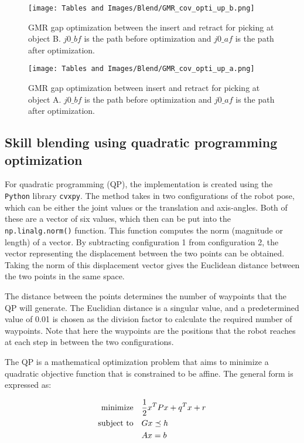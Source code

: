 \documentclass[Setup/main.tex]{subfiles}
\begin{document}
\begin{figure}[H]
    \centering
    \texttt{[image: Tables and Images/Blend/GMR\_cov\_opti\_up\_b.png]}
    \caption{GMR gap optimization between the insert and retract for picking at object B. $j0\_bf$ is the path before optimization and $j0\_af$ is the path after optimization.}
    \label{fig:GMR_cov_opti_up_b}
\end{figure}

\begin{figure}[H]
    \centering
    \texttt{[image: Tables and Images/Blend/GMR\_cov\_opti\_up\_a.png]}
    \caption{GMR gap optimization between insert and retract for picking at object A. $j0\_bf$ is the path before optimization and $j0\_af$ is the path after optimization.}
    \label{fig:GMR_cov_opti_up_a}
\end{figure}

\newpage
\subsection{Skill blending using quadratic programming optimization} \label{sec:blend:qp}
For quadratic programming (QP), the implementation is created using the \texttt{Python} library \texttt{cvxpy}. The method takes in two configurations of the robot pose, which can be either the joint values or the translation and axis-angles. Both of these are a vector of six values, which then can be put into the \texttt{np.linalg.norm()} function. This function computes the norm (magnitude or length) of a vector. By subtracting configuration 1 from configuration 2, the vector representing the displacement between the two points can be obtained. Taking the norm of this displacement vector gives the Euclidean distance between the two points in the same space.

The distance between the points determines the number of waypoints that the QP will generate. The Euclidian distance is a singular value, and a predetermined value of 0.01 is chosen as the division factor to calculate the required number of waypoints. Note that here the waypoints are the positions that the robot reaches at each step in between the two configurations. 

The QP is a mathematical optimization problem that aims to minimize a quadratic objective function that is constrained to be affine. The general form is expressed as:

\begin{align}
    \text{minimize} \quad &\frac{1}{2}x^T Px + q^Tx +r \notag \\
    \text{subject to} \quad &Gx \preceq h \\
    &Ax = b \notag 
\end{align}
\end{document}
